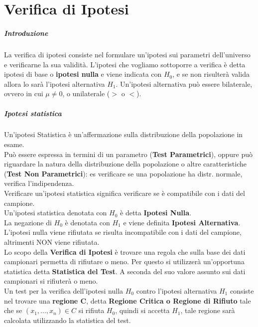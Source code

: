 \chapter{Verifica di Ipotesi}
\paragraph{Introduzione}
La verifica di ipotesi consiste nel formulare un'ipotesi sui parametri dell'universo e verificarne la sua validità.
L'ipotesi che vogliamo sottoporre a verifica è detta ipotesi di base o \textbf{ipotesi nulla} e viene indicata con $H_0$, e se non risulterà valida allora
lo sarà l'ipotesi alternativa $H_1$.
Un'ipotesi alternativa può essere bilaterale, ovvero in cui $\mu \neq 0$, o unilaterale ($>$ o $<$).


\paragraph*{Ipotesi statistica} Un'ipotesi Statistica è un'affermazione sulla
distribuzione della popolazione in esame.
\\ Può essere espressa in termini di un parametro (\textbf{Test Parametrici}), oppure
può riguardare la natura della distribuzione della popolazione o altre
caratteristiche (\textbf{Test Non Parametrici}): es verificare se una popolazione
ha distr. normale, verifica l'indipendenza.
\\ Verificare un'ipotesi statistica significa verificare se è compatibile con i dati
del campione.
\\ Un'ipotesi statistica denotata con $H_0$ è detta \textbf{Ipotesi Nulla}.
\\ La negazione di $H_0$ è denotata con $H_1$ e viene definita \textbf{Ipotesi Alternativa}.
L'ipotesi nulla viene rifiutata se risulta incompatibile con i dati del campione,
altrimenti NON viene rifiutata.
\\ Lo scopo della \textbf{Verifica di Ipotesi} è trovare una regola che sulla base dei
dati campionari permetta di rifiutare o meno. Per questo si utilizzerà un'opportuna
statistica detta \textbf{Statistica del Test}. A seconda del suo valore assunto sui dati
campionari si rifiuterà o meno.
\\ Un test per la verifica dell'ipotesi nulla $H_0$ contro l'ipotesi alternativa 
$H_1$ consiste nel trovare una \textbf{regione C}, detta \textbf{Regione Critica o Regione di Rifiuto}
tale che se $(x_1, ..., x_n) \in C$ si rifiuta $H_0$, quindi si accetta $H_1$,
tale regione sarà calcolata utilizzando la statistica del test.
